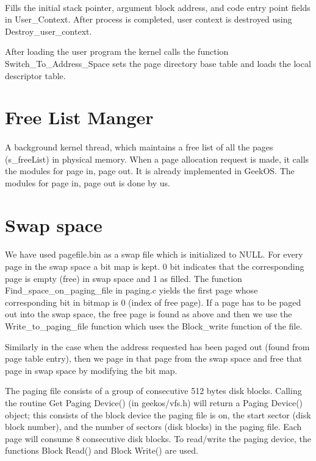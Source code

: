 \documentclass[11pt]{article}
\begin{document}
\paragraph{}
Fills the initial stack pointer, argument block address, and code entry point fields in User\_Context. After process is completed, user context is destroyed using Destroy\_user\_context.

After loading the user program the kernel calls the function Switch\_To\_Address\_Space sets the page directory base table and loads the local descriptor table.


\section{Free List Manger}
\paragraph{}
A background kernel thread, which maintains a free list of all the pages (s\_freeList) in physical memory. When a page allocation request is made, it calls the modules for page in, page out. It is already implemented in GeekOS. The modules for page in, page out is done by us.


\section{Swap space}

\paragraph{}
We have used pagefile.bin as a swap file which is initialized to NULL. For every page in the swap space a bit map is kept. 0 bit indicates that the corresponding page is empty (free) in swap space and 1 as filled. The function Find\_space\_on\_paging\_file in paging.c yields the first page whose corresponding bit in bitmap is 0 (index of free page). If a page has to be paged out into the swap space, the free page is found as above and then we use the Write\_to\_paging\_file function which uses the Block\_write function of the file.

Similarly in the case when the address requested has been paged out (found from page table entry), then we page in that page from the swap space and free that page in swap space by modifying the bit map.


The paging file consists of a group of consecutive 512 bytes disk blocks. Calling the routine Get Paging Device() (in geekos/vfs.h) will
return a Paging Device() object; this consists of the block device the paging file is on, the start sector
(disk block number), and the number of sectors (disk blocks) in the paging file. Each page will consume
8 consecutive disk blocks. To read/write the paging device, the functions Block Read() and Block
Write() are used.
\end{document}
